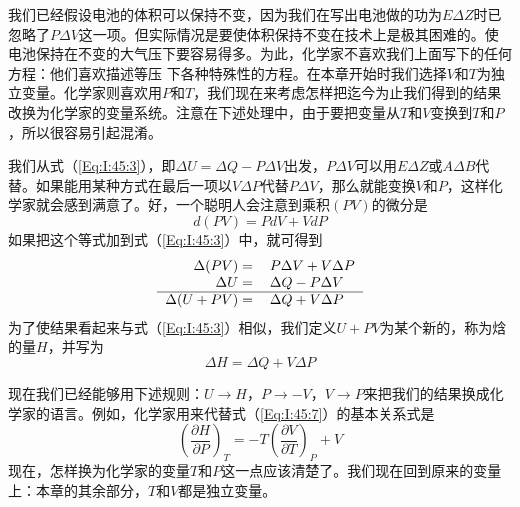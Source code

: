我们已经假设电池的体积可以保持不变，因为我们在写出电池做的功为$E \Delta Z$时已忽略了$P \Delta V$这一项。但实际情况是要使体积保持不变在技术上是极其困难的。使电池保持在不变的大气压下要容易得多。为此，化学家不喜欢我们上面写下的任何方程：他们喜欢描述等压 下各种特殊性的方程。在本章开始时我们选择$V$和$T$为独立变量。化学家则喜欢用$P$和$T$，我们现在来考虑怎样把迄今为止我们得到的结果改换为化学家的变量系统。注意在下述处理中，由于要把变量从$T$和$V$变换到$T$和$P$，所以很容易引起混淆。

我们从式（\ref{Eq:I:45:3}），即$\Delta U =\Delta Q -P \Delta V$出发，$P \Delta V$可以用$E \Delta Z$或$A \Delta B$代替。如果能用某种方式在最后一项以$V \Delta P$代替$P \Delta V$，那么就能变换$V$和$P$，这样化学家就会感到满意了。好，一个聪明人会注意到乘积$(PV)$的微分是
\begin{equation*}
    d(PV) = PdV+VdP
\end{equation*}
如果把这个等式加到式（\ref{Eq:I:45:3}）中，就可得到
\begin{equation*}
    \begin{tabular}{rl}
        $\Delta(PV)=$&$P\Delta V+V\Delta P$ \\
        $\Delta U=$&$\Delta Q - P \Delta V$ \\
        \hline
        $\Delta (U + PV)=$&$\Delta Q + V\Delta P$
    \end{tabular}
\end{equation*}
为了使结果看起来与式（\ref{Eq:I:45:3}）相似，我们定义$U +PV$为某个新的，称为焓的量$H$，并写为
\begin{equation*}
    \Delta H = \Delta Q + V\Delta P
\end{equation*}

现在我们已经能够用下述规则：$U\rightarrow H$，$P \rightarrow -V$，$V\rightarrow P$来把我们的结果换成化学家的语言。例如，化学家用来代替式（\ref{Eq:I:45:7}）的基本关系式是
\begin{equation*}
    \left(\frac{\partial H}{\partial P}\right)_T = -T\left(\frac{\partial V}{\partial T}\right)_P + V
\end{equation*}
现在，怎样换为化学家的变量$T$和$P$这一点应该清楚了。我们现在回到原来的变量上：本章的其余部分，$T$和$V$都是独立变量。

